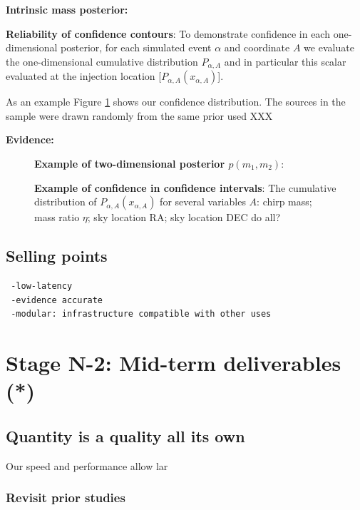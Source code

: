 \documentclass[twocolumn,prd,nofootinbib]{revtex4}
\newcommand\editremark[1]{{\color{red} #1}}
\begin{document}
\noindent \textbf{Intrinsic mass posterior:}

\noindent \textbf{Reliability of confidence contours}: To demonstrate confidence in each one-dimensional posterior, for
each simulated event $\alpha$ and coordinate $A$ we evaluate the one-dimensional cumulative distribution $P_{\alpha,A}$
and in particular this scalar evaluated at the injection location [$P_{\alpha,A}(x_{\alpha,A})$].  

As an example Figure \ref{fig:ShortTermDemo:OneDCumulativeInjectionRecovery} shows our confidence distribution.
The sources in the sample were drawn randomly from the same prior used \editremark{XXX}

\noindent \textbf{Evidence:}



\begin{figure}
\caption{\textbf{Example of two-dimensional posterior $p(m_1,m_2)$}:
}
\end{figure}

\begin{figure}
\caption{\label{fig:ShortTermDemo:OneDCumulativeInjectionRecovery}\textbf{Example of confidence in confidence
    intervals}: The cumulative distribution of $P_{\alpha,A}(x_{\alpha,A})$ for several variables $A$: chirp mass; mass
  ratio $\eta$; sky location RA; sky location DEC \editremark{do all?}
}
\end{figure}

\subsection{Selling points}

\begin{verbatim}
 -low-latency
 -evidence accurate
 -modular: infrastructure compatible with other uses
\end{verbatim}



\section{Stage N-2: Mid-term deliverables  (*)}
\subsection{Quantity is a quality all its own}
Our speed and performance allow lar

\subsubsection{Revisit prior studies}
\end{document}
